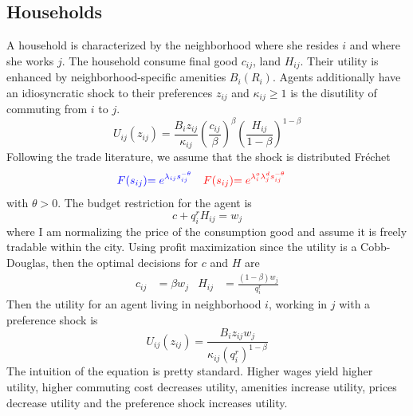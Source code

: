 \documentclass[12pt]{article}
\begin{document}
\subsection{Households}
A household is characterized by the neighborhood where she resides $i$ and where she works $j$. The household consume final good $c_{ij}$, land $H_{ij}$. Their utility is enhanced by neighborhood-specific amenities $B_i(R_i)$. Agents additionally have an idiosyncratic shock to their preferences $z_{ij}$ and $\kappa_{ij}\geq 1$ is the disutility of commuting from $i$ to $j$.  \\ 
\begin{equation}
    U_{ij}(z_{ij}) = \frac{B_iz_{ij}}{\kappa_{ij}}\left(\frac{c_{ij}}{\beta}\right)^{\beta}\left(\frac{H_{ij}}{1-\beta}\right)^{1-\beta}
\end{equation}
Following the trade literature, we assume that the shock is distributed Fréchet 
\begin{align*}
    \textcolor{blue}{F(s_{ij})} &\textcolor{blue}{= e^{\lambda_{ij}s_{ij}^{-\theta}}} & \textcolor{red}{F(s_{ij})} &\textcolor{red}{= e^{\lambda^o_{i}\lambda^d_js_{ij}^{-\theta}}}
\end{align*}
with $\theta>0$. 
The budget restriction for the agent is 
\begin{equation*}
    c + q_i^{r}H_{ij} = w_j
\end{equation*}
where I am normalizing the price of the consumption good and assume it is freely tradable within the city. Using profit maximization since the utility is a Cobb-Douglas, then the optimal decisions for $c$ and $H$ are  
\begin{align*}
    c_{ij} &= \beta w_j & H_{ij}&= \boxed{ \frac{(1-\beta)w_j}{q_i^{r}}}
\end{align*}
Then the utility for an agent living in neighborhood $i$, working in $j$ with a preference shock is 
\begin{equation}
    U_{ij}(z_{ij}) = \frac{B_iz_{ij}w_j}{\kappa_{ij}(q_{i}^r)^{1-\beta}}
\end{equation}
The intuition of the equation is pretty standard. Higher wages yield higher utility, higher commuting cost decreases utility, amenities increase utility, prices decrease utility and the preference shock increases utility. 
\end{document}
